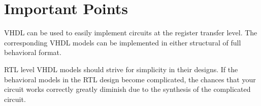 \section{Important Points}

\begin{my_list}
\item VHDL can be used to easily implement circuits at the register transfer level. The corresponding VHDL models can be implemented in either structural of full behavioral format. 

\item RTL level VHDL models should strive for simplicity in their designs. If the behavioral models in the RTL design become complicated, the chances that your circuit works correctly greatly diminish due to the synthesis of the complicated circuit. 
\end{my_list}




